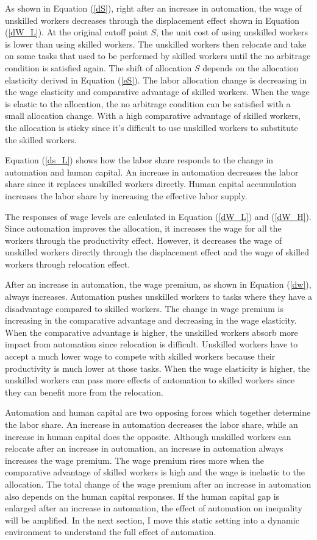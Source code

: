 \documentclass[12pt]{article}
\begin{document}
As shown in Equation (\ref{dS}), right after an increase in automation, the wage of unskilled workers decreases through the displacement effect shown in Equation (\ref{dW_L}). At the original cutoff point $S$, the unit cost of using unskilled workers is lower than using skilled workers. The unskilled workers then relocate and take on some tasks that used to be performed by skilled workers until the no arbitrage condition is satisfied again. The shift of allocation $S$ depends on the allocation elasticity derived in Equation (\ref{eS}). The labor allocation change is decreasing in the wage elasticity and comparative advantage of skilled workers. When the wage is elastic to the allocation, the no arbitrage condition can be satisfied with a small allocation change. With a high comparative advantage of skilled workers, the allocation is sticky since it's difficult to use unskilled workers to substitute the skilled workers. 

Equation (\ref{ds_L}) shows how the labor share responds to the change in automation and human capital. An increase in automation decreases the labor share since it replaces unskilled workers directly. Human capital accumulation increases the labor share by increasing the effective labor supply. 

The responses of wage levels are calculated in Equation (\ref{dW_L}) and (\ref{dW_H}). Since automation improves the allocation, it increases the wage for all the workers through the productivity effect. However, it decreases the wage of unskilled workers directly through the displacement effect and the wage of skilled workers through relocation effect. 

After an increase in automation, the wage premium, as shown in Equation (\ref{dw}), always increases. Automation pushes unskilled workers to tasks where they have a disadvantage compared to skilled workers. The change in wage premium is increasing in the comparative advantage and decreasing in the wage elasticity. When the comparative advantage is higher, the unskilled workers absorb more impact from automation since relocation is difficult. Unskilled workers have to accept a much lower wage to compete with skilled workers because their productivity is much lower at those tasks. When the wage elasticity is higher, the unskilled workers can pass more effects of automation to skilled workers since they can benefit more from the relocation.

Automation and human capital are two opposing forces which together determine the labor share. An increase in automation decreases the labor share, while an increase in human capital does the opposite. Although unskilled workers can relocate after an increase in automation, an increase in automation always increases the wage premium. The wage premium rises more when the comparative advantage of skilled workers is high and the wage is inelastic to the allocation. The total change of the wage premium after an increase in automation also depends on the human capital responses. If the human capital gap is enlarged after an increase in automation, the effect of automation on inequality will be amplified. In the next section, I move this static setting into a dynamic environment to understand the full effect of automation. 
\end{document}
